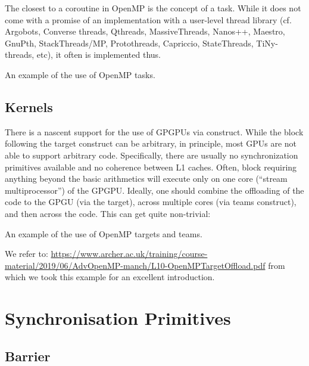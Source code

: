 The closest to a coroutine in OpenMP is the concept of a task. While it does not come with a promise of an implementation with a user-level thread library (cf. Argobots, Converse threads,	Qthreads,	MassiveThreads, Nanos++, Maestro, GnuPth, StackThreads/MP, Protothreads, Capriccio, StateThreads, TiNy-threads, etc), it often is implemented thus.  

\raggedbottom
\begin{codebox}[]{\href{https://godbolt.org/z/TM5WjPvT9}{\ExternalLink}}
\footnotesize An example of the use of OpenMP tasks.
\tcblower
{}
\end{codebox}

\subsection{Kernels}

There is a nascent support for the use of GPGPUs via  construct.
While the block following the target construct can be arbitrary, in principle, most GPUs are not able to support arbitrary code. Specifically, there are usually no synchronization primitives available and no coherence between L1 caches. Often, block requiring anything beyond the basic arithmetics will execute only on one core (``stream multiprocessor'') of the GPGPU. Ideally, one should combine the offloading of the code to the GPGU (via the target), across multiple cores (via teams construct), and then across the code. This can get quite non-trivial:

\raggedbottom
\begin{codebox}[]{\href{https://godbolt.org/z/TM5WjPvT9}{\ExternalLink}}
\footnotesize An example of the use of OpenMP targets and teams.
\tcblower
{}
\end{codebox}

We refer to:
\url{https://www.archer.ac.uk/training/course-material/2019/06/AdvOpenMP-manch/L10-OpenMPTargetOffload.pdf}
from which we took this example for an excellent introduction.

\section{Synchronisation Primitives}

\subsection{Barrier}


